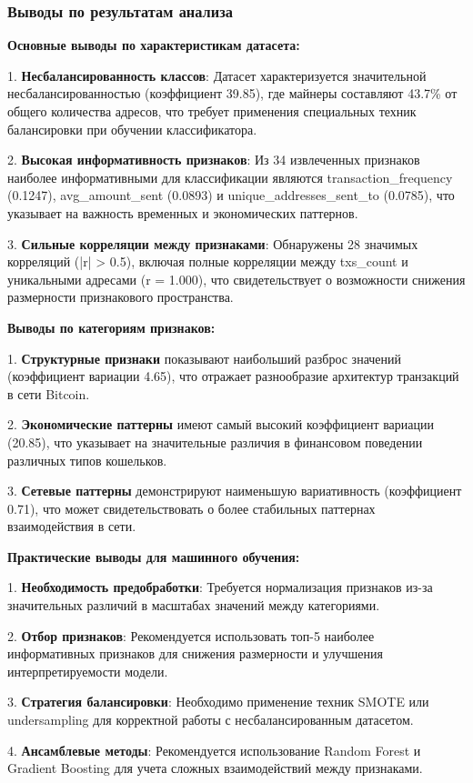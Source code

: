 \subsubsection{Выводы по результатам анализа}

\textbf{Основные выводы по характеристикам датасета:}

1. \textbf{Несбалансированность классов}: Датасет характеризуется значительной несбалансированностью (коэффициент 39.85), где майнеры составляют 43.7\% от общего количества адресов, что требует применения специальных техник балансировки при обучении классификатора.

2. \textbf{Высокая информативность признаков}: Из 34 извлеченных признаков наиболее информативными для классификации являются transaction\_frequency (0.1247), avg\_amount\_sent (0.0893) и unique\_addresses\_sent\_to (0.0785), что указывает на важность временных и экономических паттернов.

3. \textbf{Сильные корреляции между признаками}: Обнаружены 28 значимых корреляций (|r| > 0.5), включая полные корреляции между txs\_count и уникальными адресами (r = 1.000), что свидетельствует о возможности снижения размерности признакового пространства.

\textbf{Выводы по категориям признаков:}

1. \textbf{Структурные признаки} показывают наибольший разброс значений (коэффициент вариации 4.65), что отражает разнообразие архитектур транзакций в сети Bitcoin.

2. \textbf{Экономические паттерны} имеют самый высокий коэффициент вариации (20.85), что указывает на значительные различия в финансовом поведении различных типов кошельков.

3. \textbf{Сетевые паттерны} демонстрируют наименьшую вариативность (коэффициент 0.71), что может свидетельствовать о более стабильных паттернах взаимодействия в сети.

\textbf{Практические выводы для машинного обучения:}

1. \textbf{Необходимость предобработки}: Требуется нормализация признаков из-за значительных различий в масштабах значений между категориями.

2. \textbf{Отбор признаков}: Рекомендуется использовать топ-5 наиболее информативных признаков для снижения размерности и улучшения интерпретируемости модели.

3. \textbf{Стратегия балансировки}: Необходимо применение техник SMOTE или undersampling для корректной работы с несбалансированным датасетом.

4. \textbf{Ансамблевые методы}: Рекомендуется использование Random Forest и Gradient Boosting для учета сложных взаимодействий между признаками.

